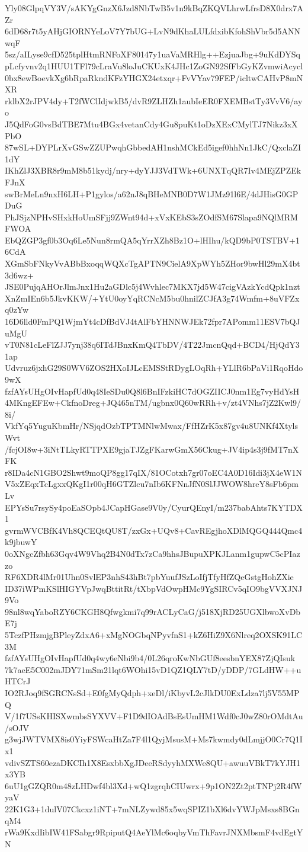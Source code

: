 Yly08GlpqVY3V/sAKYgGnzX6Jzd8NbTwB5v1n9kBqZKQVLhrwLfrsD8X0drx7AZr
6dD68r7t5yAHjGIORNYeLoV7Y7bUG+LvN9dKhaLULfdxibKfohShVbr5d5ANNwqF
5sz/aILyse9cfD525tplHtmRNFoXF80147y1uaVaMRHlg++EzjuaJbg+9uKdDYSq
pLcfyvnv2q1HUU1TFl79cLraVu8loJuCKUxK4JHc1ZoGN92SfFbGyKZvmwiAcycl
0bx8ewBoevkXg6bRpaRkndKFzYHGX24etxqr+FvVYav79FEP/icltwCAHvP8mNXR
rklbX2rJPV4dy+T2fWClIdjwkB5/dvR9ZLHZh1aubIeER0FXEMBstTy3VvV6/ayo
J5QdFoG0vsBdTBE7Mtu4BGx4vetanCdy4Gu8puKt1oDzXExCMylTJ7Nikz3xXPbO
87wSL+DYPLrXvGSwZZUPwqhGbbedAH1nshMCkEd5igef0hhNn1JkC/QxclaZI1dY
IKhZlJ3XBR8r9mM8b51kydj/nry+dyYJJ3VdTWk+6UNXTqQR7Iv4MEjZPZEkFJnX
swBrMeLn9nxH6LH+P1gylos/a62nJ8qBHeMNB0D7W1JMz91l6E/4dJHisG0GPDuG
PhJSjzNPHvSHxkHoUmSFjj9ZWnt94d+xVxKEbS3sZOdfSM67Slapa9NQlMRMFWOA
EbQZGP3gf0b3Oq6Le5Nun8rmQA5qYrrXZh8Bz1O+lHIhu/kQD9bP0TSTBV+16CdA
XGmSbFNkyVvABbBxoqqWQXcTgAPTN9CielA9XpWYh5ZHor9bwHl29mX4bt3d6wz+
JSE0PujqAHOrJlmJnx1Hu2aGDlc5j4Wvhlec7MKX7jd5W47cigVAzkYcdQpk1nzt
XnZmIEn6b5JkvKKW/+YtU0oyYqRCNcM5bu0hnilZCJfA3g74Wmfm+8uVFZxq0zYw
16D6lld0FmPQ1WjmYt4cDfBdVJ4tAlFbYHNNWJEk72fpr7APomm11ESV7bQJuMgU
vT0N81cLeFlZJJ7ynj38q6ITdJBnxKmQ4TbDV/4T22JmcnQqd+BCD4/HjQdY31ap
Udvruz6jxhG29S0WV6ZOS2HXoIJLcEMSStRDygLOqRh+YLlR6bPaVi1RqoHdo9wX
fzfAYsUHgOIvHapfUd0q48IeSDu0Q8l6BnIFzkiHC7dOGZIICJ0nm1Eg7vyHdYsH
4MKngEFEw+CkfnoDreg+JQ465nTM/ugbnx0Q60wRRh+v/zt4VNhs7jZ2Kwl9/8i/
VkfYq5YuguKbmHr/NSjqdOzbTPTMNlwMwax/FfHZrK5x87gv4u8UNKf4XtylsWvt
/fcjOI8w+3iNtTLkyRTTPXE9gjaTJZgFKarwGmX56Ckug+JV4ip4s3j9fMT7nXFK
r8IDa4cN1GBO2Shwt9moQP8gg17qIX/81OCotxh7gr07oEC4A0D16Idi3jX4eW1N
V5xZEqxTcLgxxQKgI1r00qH6GTZlcu7nIb6KFNnJfN0SlJJWOW8hreY8sFb6pmLv
EPYsSu7rsySy4poEaSOpb4JCapHGase9V0y/CyurQEnyI/m237babAhts7KYTDX1
gvrmWVCBfK4Vh8QCEQtQU8T/zxGx+UQv8+CavREgjhoXDlMQGQ444Qmc4k9jbuwY
0oXNgcZfbh63Gqv4W9Vhq2B4N0dTx7zCa9hhsJBupuXPKJLanm1gupwC5cPIazzo
RF6XDR4lMr01Uhn0SvlEP3nhS43hBt7pbYuufJSzLoIfjTfyHfZQeGstgHohZXie
ID37iWPmKSlHIGYVpJwqBttitRt/tXbpVdOwpHMc9YgSIRCv5qIO9bgVVXJNJ9Vo
98nl8wqYaboRZY6CKGH8Qfwgkmi7q99rACLyCaG/j518XjRD25UGXlbwoXvDbE7j
5TczfPHzmjgBPleyZdxA6+xMgNOGbqNPyvfnS1+kZ6HiZ9X6Nlreq2OXSK91LC3M
fzfAYsUHgOIvHapfUd0q4wy6eNbi9b4/0L26qroKwNbGUf8eesbnYEX87ZjQIsuk
7k7aeE5C002mJDY71mSm21lqt6WOhi15vD1QZ1QLY7tD/yDDP/7GLdHW++uHTCrJ
IO2RJoq9fSGRCNsSd+E0fgMyQdph+xeDl/iKbyvL2cJlkDU0ExLdza7lj5V55MPQ
V/1f7USsKHISXwmbsSYXVV+F1D9dIOAdBsEsUmHM1Wdf0cJ0wZ80rOMdtAu/sOJV
g3wjJWTVMX8is0YiyFSWcaHtZa7F4l1QyjMsusM+Ms7kwmdy0dLmjjO0Cr7Q1Ix1
vdivSZTS60ezaDKCIh1X8EsxbbXgJDeeRSdyyhMXWe8QU+awuuVBkT7kYJH1x3YB
6uU1gGZQR0m48zLHDwf4bl3Xd+wQ1zgrqhCIUwrx+9p1ON2Zt2ptTNPj2R4fWyaV
22K1G3+1dulV07Ckcxz1iNT+7mNLZywd85x5wqSPIZ1bXl6dvYWJpMsxs8BGnqM4
rWa9KxdIibIW41FSabgr9RpiputQ4AeYlMc6oqbyVmThFavrJNXMbsmF4vdEgtYN
